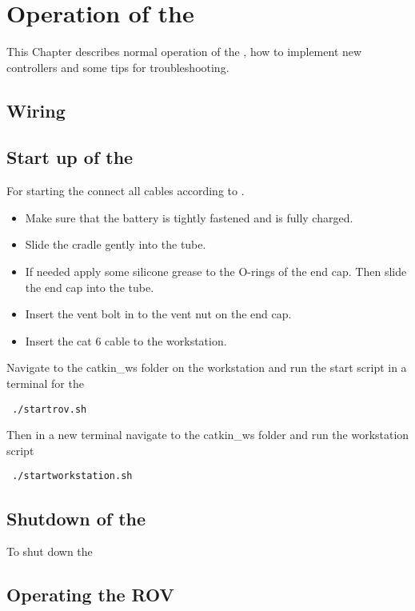 \chapter{Operation of the \abbrROV} \label{app:operation}
This Chapter describes normal operation of the \abbrROV, how to implement new controllers and some tips for troubleshooting.

\section{Wiring} \label{sec:wiring}
\section{Start up of the \abbrROV}
For starting the \abbrROV connect all cables according to .
\begin{itemize}
	\item Make sure that the battery is tightly fastened and is fully charged. 
	\item Slide the cradle gently into the \abbrROV tube. 
	\item If needed apply some silicone grease to the O-rings of the end cap. Then slide the end cap into the \abbrROV tube.
	\item Insert the vent bolt in to the vent nut on the end cap.
	\item Insert the cat 6 cable to the workstation.
 \end{itemize} 
Navigate to the catkin\_ws folder on the workstation and run the start script in a terminal for the \abbrROV
\begin{lstlisting}
 ./startrov.sh
\end{lstlisting}
Then in a new terminal navigate to the catkin\_ws folder and run the workstation script
\begin{lstlisting}
 ./startworkstation.sh
\end{lstlisting} 
\section{Shutdown of the \abbrROV}
To shut down the \abbrROV 
\section{Operating the ROV}

